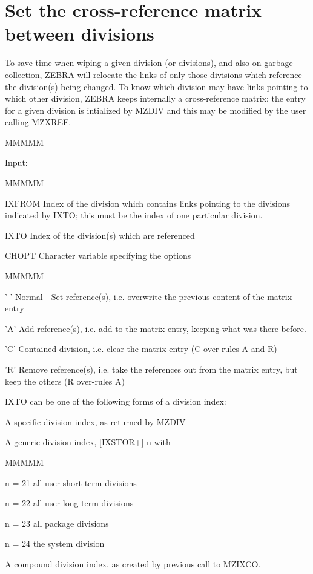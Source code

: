 \section{Set the cross-reference matrix between divisions}
\par To save time when wiping a given division (or divisions),
and also on garbage collection,
ZEBRA will relocate the links of only those divisions
which reference the division(s) being changed.
To know which division may have links pointing
to which other division,
ZEBRA keeps internally a cross-reference matrix;
the entry for a given division is intialized by MZDIV
and this may be modified by the user calling MZXREF.
\begin{DL}{MMMMM}
\item[Input:
]
\begin{DL}{MMMMM}
\item[IXFROM
]Index of the division which contains links
pointing to the divisions indicated by IXTO;
this must be the index of one particular division.
\item[IXTO
]Index of the division(s) which are referenced
\item[CHOPT
]Character variable specifying the options
\begin{DL}{MMMMM}
\item[' '
]Normal - Set reference(s), i.e. overwrite the previous
content of the matrix entry
\item['A'
]Add reference(s), i.e. add to the matrix entry,
keeping what was there before.
\item['C'
]Contained division, i.e. clear the matrix entry
(C over-rules A and R)
\item['R'
]Remove reference(s), i.e. take the references
out from the matrix entry, but keep the others (R over-rules A)
\end{DL}
\end{DL}
\end{DL}
\par
IXTO can be one of the following forms of a division index:
\begin{OL}
\item A specific division index, as returned by MZDIV
\item A generic division index, [IXSTOR+] n with
\begin{DL}{MMMMM}
\item[n = 21
]all user short term divisions
\item[n = 22
]all user long  term divisions
\item[n = 23
]all package divisions
\item[n = 24
]the system division
\end{DL}
\item A compound division index, as created by previous call to MZIXCO.
\end{OL}
